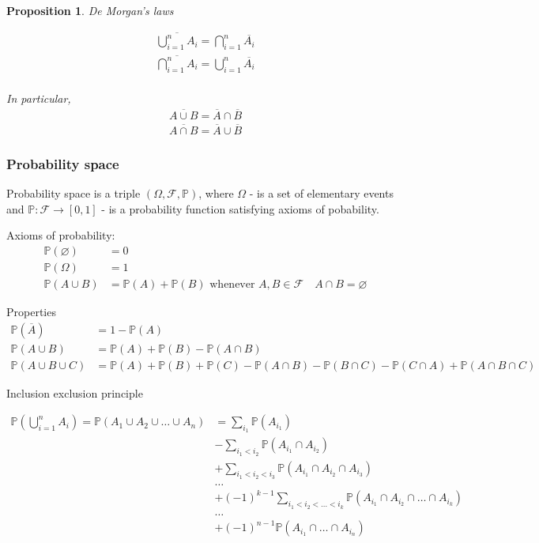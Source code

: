\documentclass[10pt]{article}
\newtheorem*{proposition}{Proposition}
\begin{document}
\begin{proposition} De Morgan's laws

\begin{align}
\overline{\bigcup_{i=1}^n A_i}=\bigcap_{i=1}^n\overline{A_i}\\
\overline{\bigcap_{i=1}^n A_i}=\bigcup_{i=1}^n\overline{A_i}\\
\end{align}

In particular,
\begin{align}
\overline{A\cup B}=\overline{A}\cap\overline{B}\\
\overline{A\cap B}=\overline{A}\cup\overline{B}
\end{align}

\end{proposition}

\subsubsection{Probability space}

Probability space is a triple $(\Omega, \mathcal{F}, \mathbb{P})$, where $\Omega$ - is a set of elementary events and $\mathbb{P}:\mathcal{F}\to [0,1]$ - is a probability function satisfying axioms of pobability.

Axioms of probability:
\begin{align}
\mathbb{P}(\varnothing)&=0\\
\mathbb{P}(\Omega)&=1\\
\mathbb{P}(A\cup B)&=\mathbb{P}(A)+\mathbb{P}(B) \mbox{ whenever } A,B\in\mathcal{F}\quad A\cap B=\varnothing
\end{align}

Properties
\begin{align}
\mathbb{P}(\overline{A})&=1-\mathbb{P}(A)\\
\mathbb{P}(A\cup B)&=\mathbb{P}(A)+\mathbb{P}(B)-\mathbb{P}(A\cap B)\\
\mathbb{P}(A\cup B\cup C)&=\mathbb{P}(A)+\mathbb{P}(B)+\mathbb{P}(C)-\mathbb{P}(A\cap B)-\mathbb{P}(B\cap C)-\mathbb{P}(C\cap A)+\mathbb{P}(A\cap B\cap C)
\end{align}

Inclusion exclusion principle

\begin{align}
\mathbb{P}\left(\bigcup_{i=1}^n A_i\right)=\mathbb{P}(A_1\cup A_2\cup \ldots \cup A_n)
&=\sum_{i_1} \mathbb{P}(A_{i_1})\\
&-\sum_{i_1<i_2}\mathbb{P}(A_{i_1}\cap A_{i_2})\\
&+\sum_{i_1<i_2<i_3}\mathbb{P}(A_{i_1}\cap A_{i_2}\cap A_{i_3})\\
&\ldots\\
&+(-1)^{k-1}\sum_{i_1<i_2<\ldots<i_k}\mathbb{P}(A_{i_1}\cap A_{i_2}\cap\ldots\cap A_{i_k})\\
&\ldots\\
&+(-1)^{n-1}\mathbb{P}(A_{i_1}\cap\ldots\cap A_{i_n})
\end{align}
\end{document}
